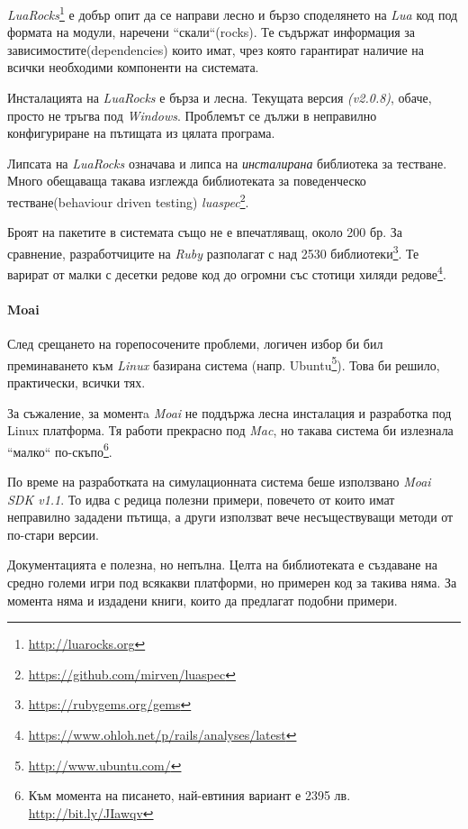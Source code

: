 		\emph{LuaRocks}\footnote{\url{http://luarocks.org}} е добър опит да се направи лесно и бързо
		споделянето на \emph{Lua} код под формата на модули, наречени ``скали``(rocks). 
		Те съдържат информация за зависимостите(dependencies) които имат, чрез която гарантират
		наличие на всички необходими компоненти на системата.
		
		Инсталацията на \emph{LuaRocks} е бърза и лесна. Текущата версия \emph{(v2.0.8)}, обаче,
		просто не тръгва под \emph{Windows}. Проблемът се дължи в неправилно конфигуриране на пътищата
		из цялата програма.
		
		Липсата на \emph{LuaRocks} означава и липса на \emph{инсталирана} библиотека за тестване.
		Много обещаваща такава изглежда библиотеката за поведенческо тестване(behaviour driven testing) 
		\emph{luaspec}\footnote{\url{https://github.com/mirven/luaspec}}.
		
		Броят на пакетите в системата също не е впечатляващ, около 200 бр. За сравнение, разработчиците
		на \emph{Ruby} разполагат с над 2530 библиотеки\footnote{\url{https://rubygems.org/gems}}. 
		Те варират от малки с десетки редове код до огромни
		със стотици хиляди редове\footnote{\url{https://www.ohloh.net/p/rails/analyses/latest}}.
		
	\paragraph{Moai}
	
		След срещането на горепосочените проблеми, логичен избор би бил преминаването 
		към \emph{Linux} базирана система (напр. Ubuntu\footnote{\url{http://www.ubuntu.com/}}). 
		Това би решило, практически, всички тях.
		
		За съжаление, за моментa \emph{Moai} не поддържа лесна инсталация и разработка под Linux платформа.
		Тя работи прекрасно под \emph{Mac}, но такава система би излезнала ``малко`` 
		по-скъпо\footnote{Към момента на писането, най-евтиния вариант е 2395 лв. \url{http://bit.ly/JIawqv}}.
		
		По време на разработката на симулационната система беше използвано \emph{Moai SDK v1.1}.
		То идва с редица полезни примери, повечето от които имат неправилно зададени пътища, а други
		използват вече несъществуващи методи от по-стари версии.
		
		Документацията е полезна, но непълна. Целта на библиотеката е създаване на средно големи игри под всякакви платформи, 
		но примерен код за такива няма. За момента няма и издадени книги, които да предлагат подобни примери.